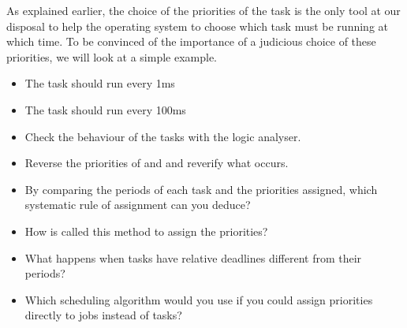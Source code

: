         As explained earlier, the choice of the priorities of the task is the only tool at our disposal to help the operating system to choose which task must be running at which time. To be convinced of the importance of a judicious choice of these priorities, we will look at a simple example.
        \begin{itemize}
            \item The task  should run every 1ms
            \item The task  should run every 100ms
            \item Check the behaviour of the tasks with the logic analyser.
            \item Reverse the priorities of  and  and reverify what occurs.
            \item By comparing the periods of each task and the priorities assigned, which systematic rule of assignment can you deduce?
            \item How is called this method to assign the priorities?
            \item What happens when tasks have relative deadlines different from their periods?
            \item Which scheduling algorithm would you use if you could assign priorities directly to jobs instead of tasks?
        \end{itemize}
